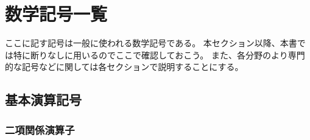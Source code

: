 \documentclass[a4j, 9pt]{ltjsarticle}
\begin{document}
  \section{数学記号一覧}
    ここに記す記号は一般に使われる数学記号である。
    本セクション以降、本書では特に断りなしに用いるのでここで確認しておこう。
    また、各分野のより専門的な記号などに関しては各セクションで説明することにする。

    \subsection{基本演算記号}
      \subsubsection{二項関係演算子}
        
\end{document}
